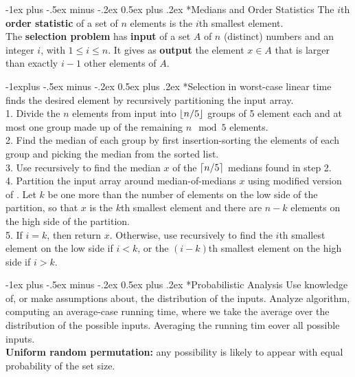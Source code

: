\documentclass[10pt,landscape]{article}
\makeatletter
\DeclarePairedDelimiter\ceil{\lceil}{\rceil}
\DeclarePairedDelimiter\floor{\lfloor}{\rfloor}
\renewcommand{\section}{\@startsection{section}{1}{0mm}%
                                {-1ex plus -.5ex minus -.2ex}%
                                {0.5ex plus .2ex}%
                                {\normalfont\large\bfseries}}
\renewcommand{\subsection}{\@startsection{subsection}{2}{0mm}%
                                {-1explus -.5ex minus -.2ex}%
                                {0.5ex plus .2ex}%
                                {\normalfont\normalsize\bfseries}}
\makeatother
\begin{document}
\begin{multicols}{3}
\section*{Medians and Order Statistics}
\scriptsize{
The $i$th \textbf{order statistic} of a set of $n$ elements is the $i$th
smallest element.\\
The \textbf{selection problem} has \textbf{input} of a set $A$ of $n$ (distinct)
numbers and an integer $i$, with $1 \leq i \leq n$. It gives as \textbf{output}
the element $x \in A$ that is larger than exactly $i - 1$ other elements of $A$.
}

\subsection*{Selection in worst-case linear time}
\scriptsize{
 finds the desired element by recursively partitioning the input
array. \\
1. Divide the $n$ elements from input into $\floor{n/5}$ groups of 5 element
each and at most one group made up of the remaining $n \mod 5$ elements.\\
2. Find the median of each group by first insertion-sorting the elements of each
group and picking the median from the sorted list.\\
3. Use  recursively to find the median $x$ of the $\ceil{n/5}$
medians found in step 2.\\
4. Partition the input array around median-of-medians $x$ using modified version
of . Let $k$ be one more than the number of elements on the low
side of the partition, so that $x$ is the $k$th smallest element and there are
$n-k$ elements on the high side of the partition.\\
5. If $i = k$, then return $x$. Otherwise, use  recursively to find
the $i$th smallest element on the low side if $i < k$, or the $(i-k)$th smallest
element on the high side if $i>k$.
}

\section*{Probabilistic Analysis}
\scriptsize{
Use knowledge of, or make assumptions about, the distribution of the inputs.
Analyze algorithm, computing an average-case running time, where we take the
average over the distribution of the possible inputs. Averaging the running tim
eover all possible inputs.\\
\textbf{Uniform random permutation:} any possibility is likely to appear with
equal probability of the set size.
}


\end{multicols}
\end{document}
